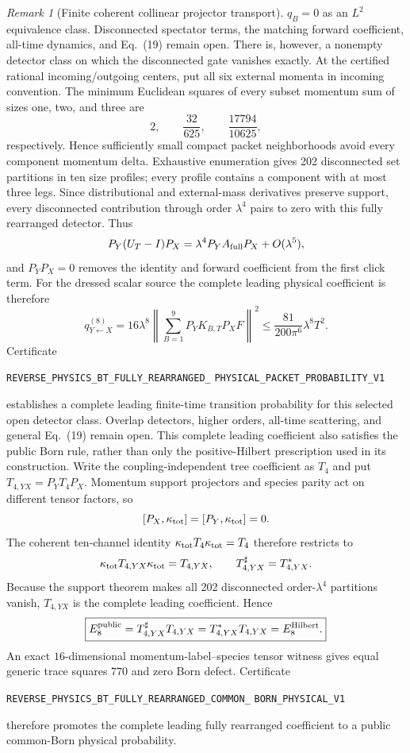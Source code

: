 \documentclass[11pt]{article}
\theoremstyle{definition}
\theoremstyle{remark}
\newtheorem{remark}[theorem]{Remark}
\begin{document}
\begin{remark}[Finite coherent collinear projector transport]
$q_B=0$ as an $L^2$ equivalence class.  Disconnected spectator terms, the
matching forward coefficient, all-time dynamics, and Eq.~(19) remain open.
There is, however, a nonempty detector class on which the disconnected gate
vanishes exactly.  At the certified rational incoming/outgoing centers, put
all six external momenta in incoming convention.  The minimum Euclidean
squares of every subset momentum sum of sizes one, two, and three are
\[
 2,\qquad \frac{32}{625},\qquad \frac{17794}{10625},
\]
respectively.  Hence sufficiently small compact packet neighborhoods avoid
every component momentum delta.  Exhaustive enumeration gives 202
disconnected set partitions in ten size profiles; every profile contains a
component with at most three legs.  Since distributional and external-mass
derivatives preserve support, every disconnected contribution through
order $\lambda^4$ pairs to zero with this fully rearranged detector.  Thus
\[
 P_Y(U_T-I)P_X=\lambda^4P_YA_{\rm full}P_X+O(\lambda^5),
\]
and $P_YP_X=0$ removes the identity and forward coefficient from the first
click term.  For the dressed scalar source the complete leading physical
coefficient is therefore
\[
 q_{Y\leftarrow X}^{(8)}=16\lambda^8
 \left\|\sum_{B=1}^{9}P_YK_{B,T}P_XF\right\|^2
 \leq\frac{81}{200\pi^6}\lambda^8T^2.
\]
Certificate
\par\noindent
\texttt{REVERSE\_PHYSICS\_BT\_FULLY\_REARRANGED\_}
\allowbreak\texttt{PHYSICAL\_PACKET\_PROBABILITY\_V1}
\par\noindent
establishes a complete leading finite-time transition probability for this
selected open detector class.  Overlap detectors, higher orders, all-time
scattering, and general Eq.~(19) remain open.
This complete leading coefficient also satisfies the public Born rule, rather
than only the positive-Hilbert prescription used in its construction.  Write
the coupling-independent tree coefficient as $T_4$ and put
$T_{4,YX}=P_YT_4P_X$.  Momentum support projectors and species parity act on
different tensor factors, so
\[
 [P_X,\kappa_{\rm tot}]=[P_Y,\kappa_{\rm tot}]=0.
\]
The coherent ten-channel identity
$\kappa_{\rm tot}T_4\kappa_{\rm tot}=T_4$ therefore restricts to
\[
 \kappa_{\rm tot}T_{4,YX}\kappa_{\rm tot}=T_{4,YX},\qquad
 T_{4,YX}^\sharp=T_{4,YX}^*.
\]
Because the support theorem makes all 202 disconnected order-$\lambda^4$
partitions vanish, $T_{4,YX}$ is the complete leading coefficient.  Hence
\[
 \boxed{E_8^{\rm public}=T_{4,YX}^\sharp T_{4,YX}
 =T_{4,YX}^*T_{4,YX}=E_8^{\rm Hilbert}.}
\]
An exact $16$-dimensional momentum-label--species tensor witness gives equal
generic trace squares $770$ and zero Born defect.  Certificate
\par\noindent
\texttt{REVERSE\_PHYSICS\_BT\_FULLY\_REARRANGED\_COMMON\_}
\allowbreak\texttt{BORN\_PHYSICAL\_V1}
\par\noindent
therefore promotes the complete leading fully rearranged coefficient to a
public common-Born physical probability.


\end{remark}
\end{document}
